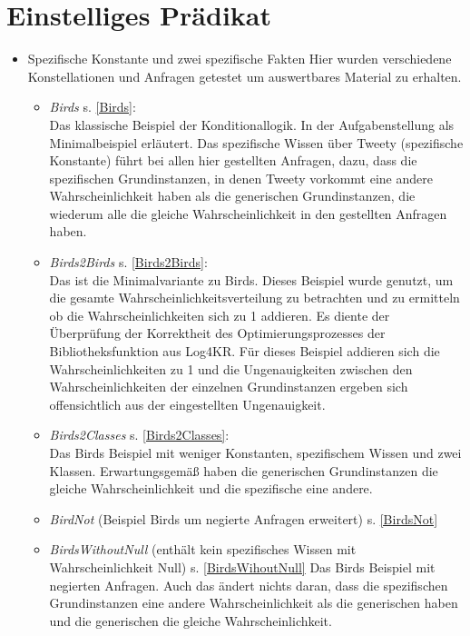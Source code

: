 \documentclass[a4paper, 11pt]{book}
\begin{document}
\section{Einstelliges Prädikat}
\begin{itemize}


\item{Spezifische Konstante und zwei spezifische Fakten}
Hier wurden verschiedene Konstellationen und Anfragen getestet um auswertbares Material zu erhalten.
\begin{itemize}
	\item \textsl{Birds} \label{BBirds} s. \ref{Birds}: \\
	Das klassische Beispiel der Konditionallogik. In der Aufgabenstellung als Minimalbeispiel erläutert. Das spezifische Wissen über Tweety (spezifische Konstante) führt bei allen hier gestellten Anfragen, dazu, dass die spezifischen Grundinstanzen, in denen Tweety vorkommt eine andere Wahrscheinlichkeit haben als die generischen Grundinstanzen, die wiederum alle die gleiche Wahrscheinlichkeit in den gestellten Anfragen haben.
	
	\item \textsl{Birds2Birds} \label{BBirds2Birds} s. \ref{Birds2Birds}:\\
	Das ist die Minimalvariante zu Birds. Dieses Beispiel wurde genutzt, um die gesamte Wahrscheinlichkeitsverteilung zu betrachten und zu ermitteln ob die Wahrscheinlichkeiten sich zu 1 addieren. Es diente der Überprüfung der Korrektheit des Optimierungsprozesses der Bibliotheksfunktion aus Log4KR. Für dieses Beispiel addieren sich die Wahrscheinlichkeiten zu 1 und die Ungenauigkeiten zwischen den Wahrscheinlichkeiten der einzelnen Grundinstanzen ergeben sich offensichtlich aus der eingestellten Ungenauigkeit.
	
	\item \textsl{Birds2Classes} \label{BBirds2Classes} s. \ref{Birds2Classes}:\\
	Das Birds Beispiel mit weniger Konstanten, spezifischem Wissen und zwei Klassen. Erwartungsgemäß haben die generischen Grundinstanzen die gleiche Wahrscheinlichkeit und die spezifische eine andere.
	
	\item \textsl{BirdNot} (Beispiel Birds um negierte Anfragen erweitert) \label{BBirdsNot} s. \ref{BirdsNot}
	
	\item \textsl{BirdsWithoutNull} (enthält kein spezifisches Wissen mit Wahrscheinlichkeit Null) \label{BBirdsWithoutNull} s. \ref{BirdsWihoutNull}
	Das Birds Beispiel mit negierten Anfragen. Auch das ändert nichts daran, dass die spezifischen Grundinstanzen eine andere Wahrscheinlichkeit als die generischen haben und die generischen die gleiche Wahrscheinlichkeit.
	

\end{itemize}
\end{itemize}
\end{document}
